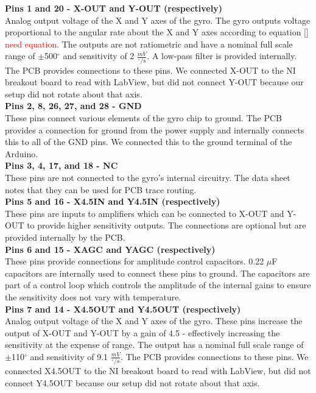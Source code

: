 \documentclass{article}
\newcommand{\xxx}[1]{\textcolor{red}{#1}}
\theoremstyle{plain}
\theoremstyle{definition}
\theoremstyle{remark}
\begin{document}
\textbf{Pins 1 and 20 - X-OUT and Y-OUT (respectively)}\\
Analog output voltage of the X and Y axes of the gyro. The gyro outputs voltage proportional to the angular rate about the X and Y axes according to equation \ref{} \xxx{need equation}. The outputs are not ratiometric and have a nominal full scale range of $\pm$500$^{\circ}$ and sensitivity of 2 $\frac{mV}{^{\circ}/s}$. A low-pass filter is provided internally. The PCB provides connections to these pins. We connected X-OUT to the NI breakout board to read with LabView, but did not connect Y-OUT because our setup did not rotate about that axis.\\

\textbf{Pins 2, 8, 26, 27, and 28 - GND}\\
These pins connect various elements of the gyro chip to ground. The PCB provides a connection for ground from the power supply and internally connects this to all of the GND pins. We connected this to the ground terminal of the Arduino.\\

\textbf{Pins 3, 4, 17, and 18 - NC}\\
These pins are not connected to the gyro's internal circuitry. The data sheet notes that they can be used for PCB trace routing.\\

\textbf{Pins 5 and 16 - X4.5IN and Y4.5IN (respectively)}\\
These pins are inputs to amplifiers which can be connected to X-OUT and Y-OUT to provide higher sensitivity outputs. The connections are optional but are provided internally by the PCB.\\

\textbf{Pins 6 and 15 - XAGC and YAGC (respectively)}\\
These pins provide connections for amplitude control capacitors. 0.22 $\mu$F capacitors are internally used to connect these pins to ground. The capacitors are part of a control loop which controls the amplitude of the internal gains to ensure the sensitivity does not vary with temperature.\\

\textbf{Pins 7 and 14 - X4.5OUT and Y4.5OUT (respectively)}\\
Analog output voltage of the X and Y axes of the gyro. These pins increase the output of X-OUT and Y-OUT by a gain of 4.5 - effectively increasing the sensitivity at the expense of range. The output has a nominal full scale range of $\pm$110$^{\circ}$ and sensitivity of 9.1 $\frac{mV}{^{\circ}/s}$. The PCB provides connections to these pins. We connected X4.5OUT to the NI breakout board to read with LabView, but did not connect Y4.5OUT because our setup did not rotate about that axis.\\
\end{document}
